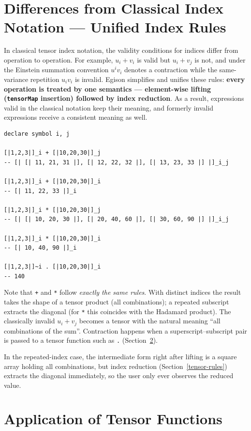 \section{Differences from Classical Index Notation --- Unified Index Rules}\label{tensor-unified}

In classical tensor index notation, the validity conditions for indices differ from operation to operation.
For example, $u_i + v_i$ is valid but $u_i + v_j$ is not, and under the Einstein summation convention $u^i v_i$ denotes a contraction while the same-variance repetition $u_i v_i$ is invalid.
Egison simplifies and unifies these rules:
\textbf{every operation is treated by one semantics --- element-wise lifting (\lstinline{tensorMap} insertion) followed by index reduction}.
As a result, expressions valid in the classical notation keep their meaning, and formerly invalid expressions receive a consistent meaning as well.
\begin{lstlisting}[language=egison,numbers=none]
declare symbol i, j

[|1,2,3|]_i + [|10,20,30|]_j
-- [| [| 11, 21, 31 |], [| 12, 22, 32 |], [| 13, 23, 33 |] |]_i_j

[|1,2,3|]_i + [|10,20,30|]_i
-- [| 11, 22, 33 |]_i

[|1,2,3|]_i * [|10,20,30|]_j
-- [| [| 10, 20, 30 |], [| 20, 40, 60 |], [| 30, 60, 90 |] |]_i_j

[|1,2,3|]_i * [|10,20,30|]_i
-- [| 10, 40, 90 |]_i

[|1,2,3|]~i . [|10,20,30|]_i
-- 140
\end{lstlisting}
Note that \lstinline{+} and \lstinline{*} follow \emph{exactly the same rules}.
With distinct indices the result takes the shape of a tensor product (all combinations); a repeated subscript extracts the diagonal (for \lstinline{*} this coincides with the Hadamard product).
The classically invalid $u_i + v_j$ becomes a tensor with the natural meaning ``all combinations of the sum''.
Contraction happens when a superscript--subscript pair is passed to a tensor function such as \lstinline{.} (Section~\ref{tensor-tensorfunc}).

In the repeated-index case, the intermediate form right after lifting is a square array holding all combinations, but index reduction (Section~\ref{tensor-rules}) extracts the diagonal immediately, so the user only ever observes the reduced value.

\section{Application of Tensor Functions}\label{tensor-tensorfunc}

